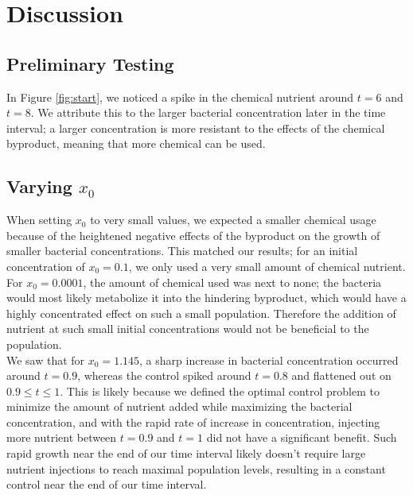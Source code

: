 \documentclass[10pt]{article}
\theoremstyle{exmp}
\begin{document}
\newpage
\section{Discussion} 
\label{sec:discussion} 

\subsection{Preliminary Testing}

\noindent In Figure \ref{fig:start}, we noticed a spike in the chemical nutrient around $t = 6$ and $t = 8$. We attribute this to the larger bacterial concentration later in the time interval; a larger concentration is more resistant to the effects of the chemical byproduct, meaning that more chemical can be used. 

\subsection{Varying $x_0$}

\noindent When setting $x_0$ to very small values, we expected a smaller chemical usage because of the heightened negative effects of the byproduct on the growth of smaller bacterial concentrations. This matched our results; for an initial concentration of $x_0 = 0.1$, we only used a very small amount of chemical nutrient. For $x_0 = 0.0001$, the amount of chemical used was next to none; the bacteria would most likely metabolize it into the hindering byproduct, which would have a highly concentrated effect on such a small population. Therefore the addition of nutrient at such small initial concentrations would not be beneficial to the population. \\

\noindent We saw that for $x_0 = 1.145$, a sharp increase in bacterial concentration occurred around $t = 0.9$, whereas the control spiked around $t = 0.8$ and flattened out on $0.9 \leq t \leq 1$. This is likely because we defined the optimal control problem to minimize the amount of nutrient added while maximizing the bacterial concentration, and with the rapid rate of increase in concentration, injecting more nutrient between $t= 0.9$ and $t = 1$ did not have a significant benefit. Such rapid growth near the end of our time interval likely doesn't require large nutrient injections to reach maximal population levels, resulting in a constant control near the end of our time interval. \\
\end{document}
